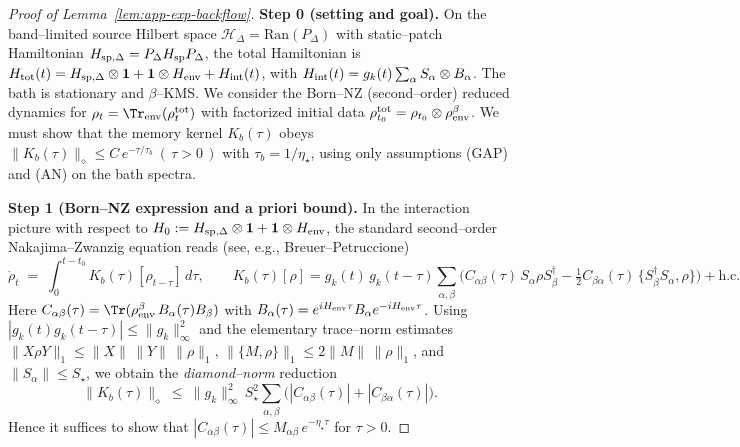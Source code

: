 \documentclass[10pt]{article}
\theoremstyle{definition}
\theoremstyle{plain}
\begin{document}
\begin{proof}[Proof of Lemma~\ref{lem:app-exp-backflow}]
\textbf{Step 0 (setting and goal).}
On the band–limited source Hilbert space \(\mathcal H_\Delta=\mathrm{Ran}(P_\Delta)\) with static–patch Hamiltonian
\(H_{{\rm sp},\Delta}=P_\Delta H_{\rm sp}P_\Delta\), the total Hamiltonian is
\(H_{\rm tot}(t)=H_{{\rm sp},\Delta}\otimes \mathbf 1 + \mathbf 1\otimes H_{\rm env}+H_{\rm int}(t)\),
with \(H_{\rm int}(t)=g_k(t)\sum_\alpha S_\alpha\otimes B_\alpha\).
The bath is stationary and \(\beta\)–KMS.
We consider the Born–NZ (second–order) reduced dynamics for \(\rho_t=\Tr_{\rm env}(\rho^{\rm tot}_t)\) with factorized initial data
\(\rho^{\rm tot}_{t_0}=\rho_{t_0}\otimes \rho^\beta_{\rm env}\).
We must show that the memory kernel \(K_b(\tau)\) obeys
\(
\|K_b(\tau)\|_\diamond \le C\,e^{-\tau/\tau_b}\ (\,\tau>0\,)
\)
with \(\tau_b=1/\eta_\star\), using only assumptions (GAP) and (AN) on the bath spectra.

\smallskip
\textbf{Step 1 (Born–NZ expression and a priori bound).}
In the interaction picture with respect to \(H_0:=H_{{\rm sp},\Delta}\otimes \mathbf 1 + \mathbf 1\otimes H_{\rm env}\),
the standard second–order Nakajima–Zwanzig equation reads (see, e.g., Breuer–Petruccione)
\begin{equation}\label{eq:born-nz-form}
\dot\rho_t \;=\; \int_{0}^{t-t_0}\! K_b(\tau)[\rho_{t-\tau}]\,d\tau,
\qquad
K_b(\tau)[\rho]
= g_k(t)\,g_k(t-\tau)\sum_{\alpha,\beta}\Big( C_{\alpha\beta}(\tau)\,S_\alpha \rho S_\beta^\dagger
- \tfrac12 C_{\beta\alpha}(\tau)\,\{S_\beta^\dagger S_\alpha,\rho\}\Big) + \mathrm{h.c.}
\end{equation}
Here \(C_{\alpha\beta}(\tau)=\Tr(\rho^\beta_{\rm env}\,B_\alpha(\tau)B_\beta)\) with \(B_\alpha(\tau)=e^{iH_{\rm env}\tau}B_\alpha e^{-iH_{\rm env}\tau}\).
Using \(|g_k(t)g_k(t-\tau)|\le \|g_k\|_\infty^2\) and the elementary trace–norm estimates
\(\|X\rho Y\|_1\le \|X\|\,\|Y\|\,\|\rho\|_1\), \(\|\{M,\rho\}\|_1\le 2\|M\|\,\|\rho\|_1\),
and \(\|S_\alpha\|\le S_\star\), we obtain the \emph{diamond–norm} reduction
\begin{equation}\label{eq:diamond-reduction}
\big\|K_b(\tau)\big\|_\diamond
\ \le\ \|g_k\|_\infty^2\,S_\star^2\sum_{\alpha,\beta}\Big(|C_{\alpha\beta}(\tau)|+|C_{\beta\alpha}(\tau)|\Big).
\end{equation}
Hence it suffices to show that \( |C_{\alpha\beta}(\tau)|\le M_{\alpha\beta}\,e^{-\eta_\star \tau}\) for \(\tau>0\).


\end{proof}
\end{document}
